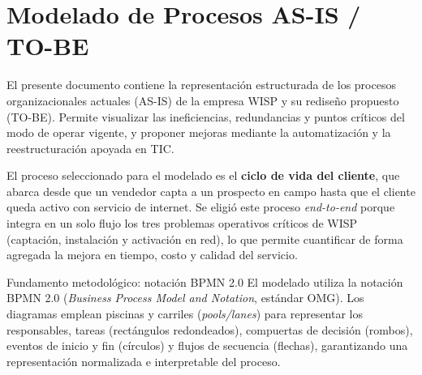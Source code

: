 \chapter{Modelado de Procesos AS-IS / TO-BE}
\label{chap:procesos}



El presente documento contiene la representación estructurada de los procesos
organizacionales actuales (AS-IS) de la empresa WISP y su rediseño propuesto
(TO-BE). Permite visualizar las ineficiencias, redundancias y puntos críticos del
modo de operar vigente, y proponer mejoras mediante la automatización y la
reestructuración apoyada en TIC.

El proceso seleccionado para el modelado es el \textbf{ciclo de vida del cliente},
que abarca desde que un vendedor capta a un prospecto en campo hasta que el cliente
queda activo con servicio de internet. Se eligió este proceso \textit{end-to-end}
porque integra en un solo flujo los tres problemas operativos críticos de WISP
(captación, instalación y activación en red), lo que permite cuantificar de forma
agregada la mejora en tiempo, costo y calidad del servicio.

\begin{upeubox}{Fundamento metodológico: notación BPMN 2.0}
El modelado utiliza la notación BPMN 2.0 (\textit{Business Process Model and
Notation}, estándar OMG). Los diagramas emplean piscinas y carriles
(\textit{pools/lanes}) para representar los responsables, tareas (rectángulos
redondeados), compuertas de decisión (rombos), eventos de inicio y fin (círculos) y
flujos de secuencia (flechas), garantizando una representación normalizada e
interpretable del proceso.
\end{upeubox}

